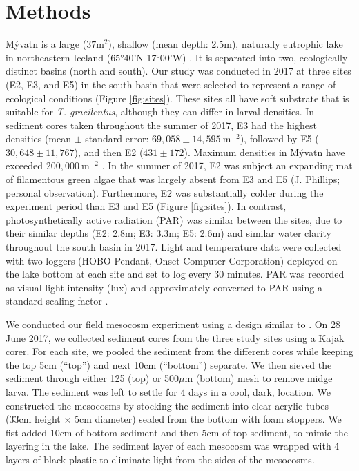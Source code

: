 

\section*{Methods}


M\'{y}vatn is a large ($37\text{m}^2$), shallow (mean depth: 2.5m), 
naturally eutrophic lake in northeastern Iceland (65°40’N 17°00’W) \citep{einarsson2004}.
It is separated into two, ecologically distinct basins (north and south).
Our study was conducted in 2017 at three sites (E2, E3, and E5) in the south basin 
that were selected to represent a range of ecological conditions (Figure \ref{fig:sites}).
These sites all have soft substrate that is suitable for \emph{T. gracilentus},
although they can differ in larval densities. 
In sediment cores taken throughout the summer of 2017, E3 had the highest densities 
(mean $\pm$ standard error: $69,058 \pm 14,595~\text{m}^{-2}$),
followed by E5 ($30,648 \pm 11,767$), and then E2 ($431 \pm 172$).
Maximum densities in M\'{y}vatn have exceeded $200,000~\text{m}^{-2}$ \citep{lindegaard1979}.
In the summer of 2017, 
E2 was subject an expanding mat of filamentous green algae 
that was largely absent from E3 and E5 (J. Phillips; personal observation).
Furthermore, E2 was substantially colder during the experiment period than 
E3 and E5 (Figure \ref{fig:sites}).
In contrast, photosynthetically active radiation (PAR) was similar between the sites,
due to their similar depths (E2: 2.8m; E3: 3.3m; E5: 2.6m)
and similar water clarity throughout the south basin in 2017.
Light and temperature data were collected with two loggers 
(HOBO Pendant, Onset Computer Corporation) deployed on the lake bottom at each site
and set to log every 30 minutes.
PAR was recorded as visual light intensity (lux)
and approximately converted to PAR using a standard scaling factor \citep{thimijan1983}.

We conducted our field mesocosm experiment using a design
similar to \citep{phillips2019}.
On 28 June 2017, we collected sediment cores from the three study sites using a Kajak corer. 
For each site, we pooled the sediment from the different cores while keeping the 
top 5cm (``top'') and next 10cm (``bottom'') separate.
We then sieved the sediment through either 125 (top) or 500$\mu \text{m}$ (bottom) mesh
to remove midge larva.
The sediment was left to settle for 4 days in a cool, dark, location.
We constructed the mesocosms by stocking the sediment into 
clear acrylic tubes (33cm height $\times$ 5cm diameter) 
sealed from the bottom with foam stoppers.
We fist added 10cm of bottom sediment and then 5cm of top sediment, 
to mimic the layering in the lake.
The sediment layer of each mesocosm was wrapped with 4 layers of black plastic
to eliminate light from the sides of the mesocosms.

